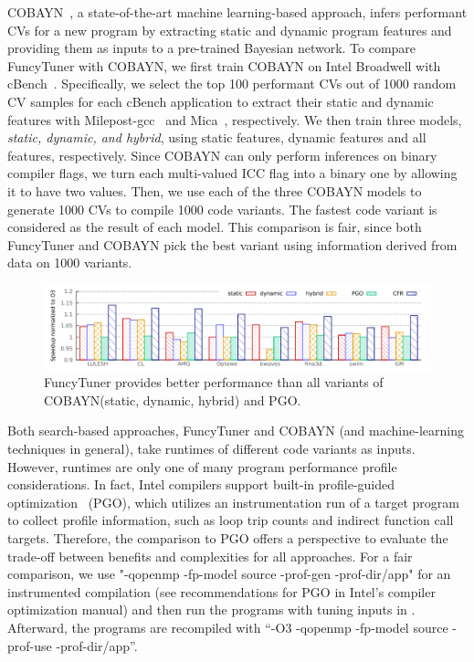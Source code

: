 COBAYN~\cite{cobayn}, a state-of-the-art machine
learning-based approach, infers performant CVs for a new program by
extracting static and dynamic program features and providing them as inputs to a
pre-trained Bayesian network.  To compare FuncyTuner with COBAYN, we
first train COBAYN on Intel Broadwell with cBench~\cite{cbench}.
Specifically, we select the top 100 performant CVs out of 1000 random
CV samples for each cBench application to extract their static and
dynamic features with Milepost-gcc~\cite{milepostgcc} and
Mica~\cite{mica}, respectively.  We then train three models,
{\em static, dynamic, and hybrid}, using static features, dynamic features
and all features, respectively.  Since COBAYN can only
perform inferences on binary compiler flags, we turn each multi-valued
ICC flag into a binary one by allowing it to have two values.  Then,
we use each of the three COBAYN models to generate 1000 CVs to compile
1000 code variants. The fastest code variant is considered as the
result of each model.  This comparison is fair, since both FuncyTuner
and COBAYN pick the best variant using information derived from data on 1000  variants.
\begin{figure}
\includegraphics[width=\linewidth]{gnuplot_temp/pgo.pdf}
\vspace{-6mm}
\caption{FuncyTuner provides better performance than all variants of COBAYN(static, dynamic, hybrid) and PGO.}
\label{fig:pgo}
\vspace{-2mm}
\end{figure}
Both search-based approaches, FuncyTuner and COBAYN (and machine-learning techniques in general), take runtimes of different code variants as inputs.  However, runtimes are
only one of many program performance profile considerations.  In fact,
Intel compilers support built-in profile-guided
optimization~\cite{pgo} (PGO), which utilizes an instrumentation run
of a target program to collect profile information, such as loop trip
counts and indirect function call targets.  Therefore, the comparison
to PGO offers a perspective to evaluate the trade-off between benefits
and complexities for all approaches.  For a fair comparison, we use
"-qopenmp -fp-model source -prof-gen -prof-dir/app" for an
instrumented compilation (see recommendations for PGO in Intel's
compiler optimization manual) and then run the programs with tuning
inputs in .  Afterward, the programs are recompiled
with ``-O3 -qopenmp -fp-model source -prof-use -prof-dir/app''.

